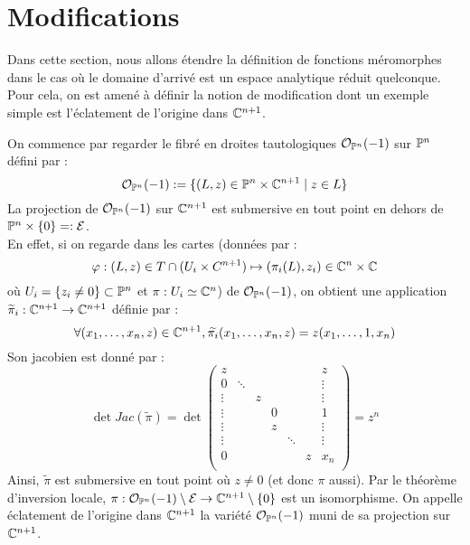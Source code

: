 \documentclass[a4page,10pt]{article}
\begin{document}

\fi
\section{Modifications}
Dans cette section, nous allons \'etendre la d\'efinition de fonctions m\'eromorphes dans le cas o\`u le domaine d'arriv\'e est un espace analytique r\'eduit quelconque. Pour cela, on est amen\'e \`a d\'efinir la notion de modification dont un exemple simple est l'\'eclatement de l'origine dans $\C^{n+1}$.
\begin{Ex}
On commence par regarder le fibr\'e en droites tautologiques $ \Ocal_{\P^n}(-1)$ sur $\P^n$ d\'efini par :
\[ \Ocal_{\P^n}(-1):= \{ (L,z) \in \P^n\times \C^{n+1} \mid z \in L \}
\]
La projection de $\Ocal_{\P^n}(-1)$ sur $\C^{n+1}$ est submersive en tout point en dehors de $\P^n\times\{0\}=:\Ecal$. \\
En effet, si on regarde dans les cartes (donn\'ees par :
    \[\varphi :(L,z) \in T \cap (U_i \times C^{n+1}) \mapsto (\pi_i(L),z_i)\in \C^n \times \C
\]
 o\`u $U_i=\{z_i \neq 0\} \subset \P^n$ et $\pi : U_i \simeq \C^n$)
de $\Ocal_{\P^n}(-1)$, on obtient une application $\widetilde{\pi}_i : \C^{n+1} \to \C^{n+1}$ d\'efinie par :
\[  \forall (x_1,\ldots,x_n,z) \in \C^{n+1}, \widetilde{\pi_i}(x_1,\ldots,x_n,z)=z(x_1,\ldots,1,x_n)
\]
Son jacobien est donn\'e par :
\[
 \det Jac(\widetilde{\pi})=\det\begin{pmatrix}
    z&&&&&&z \\
    0&\ddots&&&&&\vdots\\
    \vdots&&z&&&&\vdots\\
    \vdots&&&0&&&1\\
    \vdots&&&z&&&\vdots\\
    \vdots&&&&\ddots&&\vdots\\
    0&&&&&z&x_n\\
    \end{pmatrix}=z^n
  \]
  Ainsi, $\widetilde{\pi}$ est submersive en tout point o\`u $z \neq 0$ (et donc $\pi$ aussi).
  Par le th\'eor\`eme d'inversion locale, $\pi : \Ocal_{\P^n}(-1)\setminus \Ecal \to \C^{n+1} \setminus \{0\}$ est un isomorphisme. On appelle \'eclatement de l'origine dans $\C^{n+1}$ la vari\'et\'e $\Ocal_{\P^n}(-1)$ muni de sa projection sur $\C^{n+1}$.
\end{Ex}
\end{document}
